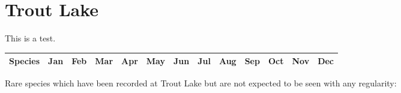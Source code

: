 \documentclass[8pt,letterpaper,notumble,foldmark]{leaflet}
\begin{document}
\selectfont

\section{Trout Lake}

This is a test.

\newpage

\linespread{0}

{\footnotesize
\tabcolsep=0.005cm

\begin{longtable}{|l|llllllllllllllllllllllllllllllllllllllllllllllll|}
\hline
Species & \multicolumn{4}{c}{Jan} & \multicolumn{4}{c}{Feb} & \multicolumn{4}{c}{Mar} &
\multicolumn{4}{c}{Apr} & \multicolumn{4}{c}{May} & \multicolumn{4}{c}{Jun} &
\multicolumn{4}{c}{Jul} & \multicolumn{4}{c}{Aug} & \multicolumn{4}{c}{Sep} &
\multicolumn{4}{c}{Oct} & \multicolumn{4}{c}{Nov} & \multicolumn{4}{c}{Dec} \\
\hline
\endhead



\hline
\end{longtable}
}
\footnotesize
Rare species which have been recorded at Trout Lake but are not expected to be seen with any regularity: \newline
\par

\end{document}
